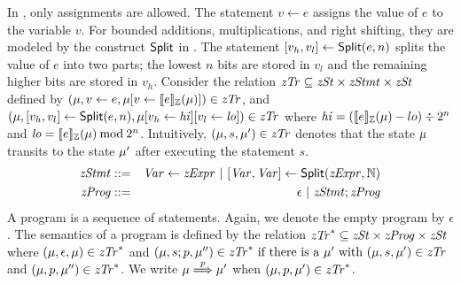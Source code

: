 In \zdsl, only assignments are allowed.
The statement $v \leftarrow e$ assigns the value of $e$
to the variable $v$. For bounded additions, multiplications, and right
shifting, they are modeled by the construct $\mbox{\textsf{Split}}$ in \zdsl.
The statement ${[}{v_h}, {v_l}{]} \leftarrow
\mbox{\textsf{Split}}(e, n)$ splits the value of $e$ into two parts;
the lowest $n$ bits are stored in $v_l$ and the remaining higher bits
are stored in $v_h$.
Consider the relation $\mathit{zTr} \subseteq \mathit{zSt} \times \mathit{zStmt} \times \mathit{zSt}$ defined
by $(\mu, v \leftarrow e, \mu{[}{v} \leftarrow {[\![{e}]\!]_{\mathbb{Z}}(\mu)}{]}) \in \mathit{zTr}$, and
  $(\mu, {[}{v_h}, {v_l}{]} \leftarrow \mbox{\textsf{Split}} (e, n),
  \mu{[}{v_h} \leftarrow {\mathit{hi}}{]}{[}{v_l} \leftarrow {\mathit{lo}}{]}) \in \mathit{zTr}$
where
$\mathit{hi} = ([\![{e}]\!]_{\mathbb{Z}}(\mu) - lo) \div 2^{n}$ and
$\mathit{lo} = [\![{e}]\!]_{\mathbb{Z}}(\mu) \mathbin{\textmd{mod}} 2^{n}$.
Intuitively, $(\mu, s, \mu') \in \mathit{zTr}$ denotes that the state $\mu$ transits to
the state $\mu'$ after executing the statement $s$.
\begin{eqnarray*}
  \mathit{zStmt} & ::= & \mathit{Var} \leftarrow \mathit{zExpr}
            \ |\  {[}{\mathit{Var}}, {\mathit{Var}}{]} \leftarrow \mbox{\textsf{Split}} (\mathit{zExpr}, \mathbb{N}) \\
  \mathit{zProg} & ::= & \epsilon \ |\ \mathit{zStmt}; \mathit{zProg}
\end{eqnarray*}
A program is a sequence of statements. Again, we denote the empty program by
$\epsilon$.
The semantics of a program is defined by the relation
$\mathit{zTr}^* \subseteq \mathit{zSt} \times \mathit{zProg} \times \mathit{zSt}$ where
$(\mu, \epsilon, \mu) \in \mathit{zTr}^*$ and
$(\mu, s; p, \mu'') \in \mathit{zTr}^* \textmd{ if }
    \textmd{there is a } \mu' \textmd{ with }
    (\mu, s, \mu') \in \mathit{zTr}$ and
    $(\mu, p, \mu'') \in \mathit{zTr}^*$.
We write $\mu \overset{p}{\Longrightarrow} \mu'$ when $(\mu, p, \mu') \in \mathit{zTr}^*$.


